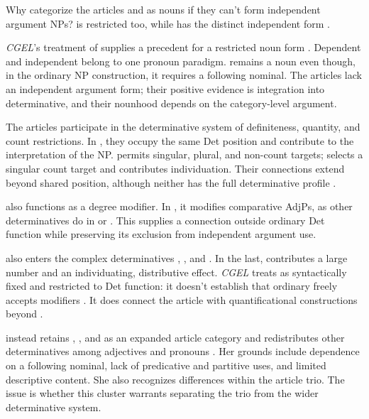 \documentclass[12pt]{article}
\begin{document}
Why categorize the articles  and  as nouns if they can't form independent argument NPs?  is restricted too, while  has the distinct independent form  \citep[371--372, 410--411]{huddleston2002}.

\textit{CGEL}'s treatment of  supplies a precedent for a restricted noun form \citep[470--471]{huddleston2002}. Dependent  and independent  belong to one pronoun paradigm.  remains a noun even though, in the ordinary NP construction, it requires a following nominal. The articles lack an independent argument form; their positive evidence is integration into determinative, and their nounhood depends on the category-level argument.

The articles participate in the determinative system of definiteness, quantity, and count restrictions. In , they occupy the same Det position and contribute to the interpretation of the NP.  permits singular, plural, and non-count targets;  selects a singular count target and contributes individuation. Their connections extend beyond shared position, although neither has the full determinative profile \citep[368--373]{huddleston2002}.

 also functions as a degree modifier. In , it modifies comparative AdjPs, as other determinatives do in  or  \citep[1131--1132, 1135--1136]{huddleston2002}. This supplies a connection outside ordinary Det function while preserving its exclusion from independent argument use.

 also enters the complex determinatives , , and . In the last,  contributes a large number and  an individuating, distributive effect. \textit{CGEL} treats  as syntactically fixed and restricted to Det function: it doesn't establish that ordinary  freely accepts modifiers \citep[392--394]{huddleston2002}. It does connect the article with quantificational constructions beyond .

\textcite[153--158]{spinillo2004reconceptualising} instead retains , , and  as an expanded article category and redistributes other determinatives among adjectives and pronouns \citep[194--195]{spinillo2004reconceptualising}. Her grounds include dependence on a following nominal, lack of predicative and partitive uses, and limited descriptive content. She also recognizes differences within the article trio. The issue is whether this cluster warrants separating the trio from the wider determinative system.
\end{document}

